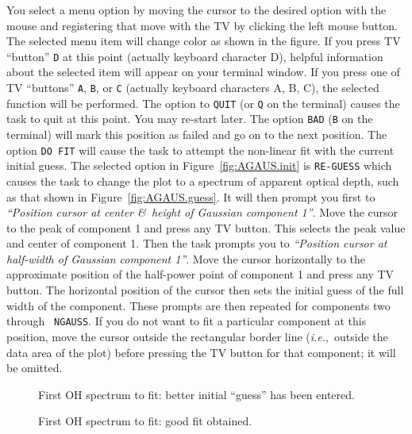 \documentclass[twoside]{article}
\newcommand{\ie}{{\it i.e.},}
\newcommand{\putfig}[1]{\texttt{[image: \#1.eps]}}
\begin{document}
You select a menu option by moving the cursor to the desired option
with the mouse and registering that move with the TV by clicking the
left mouse button.  The selected menu item will change color as shown
in the figure.  If you press TV ``button'' {\tt D} at this point
(actually keyboard character D), helpful information about the
selected item will appear on your terminal window.  If you press one
of TV ``buttons'' {\tt A}, {\tt B}, or {\tt C} (actually keyboard
characters A, B, C), the selected function will be performed.  The
option to {\tt QUIT} (or {\tt Q} on the terminal) causes the task to
quit at this point.  You may re-start later.  The option {\tt BAD}
({\tt B} on the terminal) will mark this position as failed and go on
to the next position.  The option {\tt DO FIT} will cause the task to
attempt the non-linear fit with the current initial guess.  The
selected option in Figure~\ref{fig:AGAUS.init} is {\tt RE-GUESS} which
causes the task to change the plot to a spectrum of apparent optical
depth, such as that shown in Figure~\ref{fig:AGAUS.guess}.  It will
then prompt you first to {\it ``Position cursor at center \&\ height
  of Gaussian component 1''}.  Move the cursor to the peak of
component 1 and press any TV button.  This selects the peak value and
center of component 1.  Then the task prompts you to {\it ``Position
  cursor at half-width of Gaussian component 1''}.  Move the cursor
horizontally to the approximate position of the half-power point of
component 1 and press any TV button.  The horizontal position of the
cursor then sets the initial guess of the full width of the component.
These prompts are then repeated for components two through {\tt
  NGAUSS}\@.  If you do not want to fit a particular component at
this position, move the cursor outside the rectangular border line
(\ie\ outside the data area of the plot) before pressing the TV
button for that component; it will be omitted.

\begin{figure}
\begin{center}
\resizebox{6.0in}{!}{\putfig{AGAUS.guessed}}
\caption{First OH spectrum to fit: better initial ``guess'' has been
  entered.}
\label{fig:AGAUS.guessed}
\end{center}
\end{figure}

\begin{figure}
\begin{center}
\resizebox{6.0in}{!}{\putfig{AGAUS.fit}}
\caption{First OH spectrum to fit: good fit obtained.}
\label{fig:AGAUS.good}
\end{center}
\end{figure}
\end{document}
